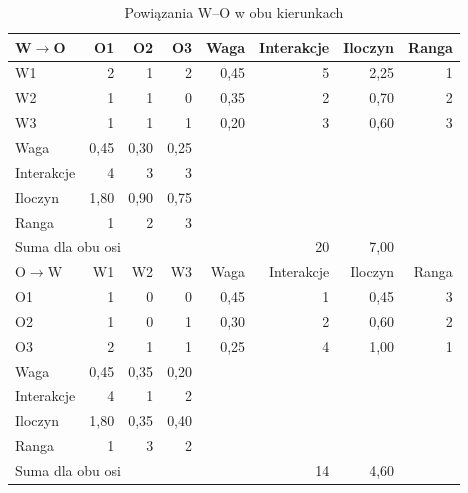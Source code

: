 \documentclass[12pt,a4paper,oneside]{article}
\begin{document}
\begin{table}[H]\centering\small\renewcommand{\arraystretch}{0.96}
\caption{Powiązania W--O w obu kierunkach}
\begin{tabular}{@{}lrrrrrrr@{}}\toprule
W$\to$O & O1 & O2 & O3 & Waga & Interakcje & Iloczyn & Ranga \\
\midrule
W1 & 2 & 1 & 2 & 0,45 & 5 & 2,25 & 1 \\
W2 & 1 & 1 & 0 & 0,35 & 2 & 0,70 & 2 \\
W3 & 1 & 1 & 1 & 0,20 & 3 & 0,60 & 3 \\
Waga & 0,45 & 0,30 & 0,25 &  &  &  &  \\
Interakcje & 4 & 3 & 3 &  &  &  &  \\
Iloczyn & 1,80 & 0,90 & 0,75 &  &  &  &  \\
Ranga & 1 & 2 & 3 &  &  &  &  \\
\multicolumn{5}{l}{Suma dla obu osi} & 20 & 7,00 &  \\
\midrule
O$\to$W & W1 & W2 & W3 & Waga & Interakcje & Iloczyn & Ranga \\
\midrule
O1 & 1 & 0 & 0 & 0,45 & 1 & 0,45 & 3 \\
O2 & 1 & 0 & 1 & 0,30 & 2 & 0,60 & 2 \\
O3 & 2 & 1 & 1 & 0,25 & 4 & 1,00 & 1 \\
Waga & 0,45 & 0,35 & 0,20 &  &  &  &  \\
Interakcje & 4 & 1 & 2 &  &  &  &  \\
Iloczyn & 1,80 & 0,35 & 0,40 &  &  &  &  \\
Ranga & 1 & 3 & 2 &  &  &  &  \\
\multicolumn{5}{l}{Suma dla obu osi} & 14 & 4,60 &  \\
\bottomrule
\end{tabular}\end{table}
\end{document}
